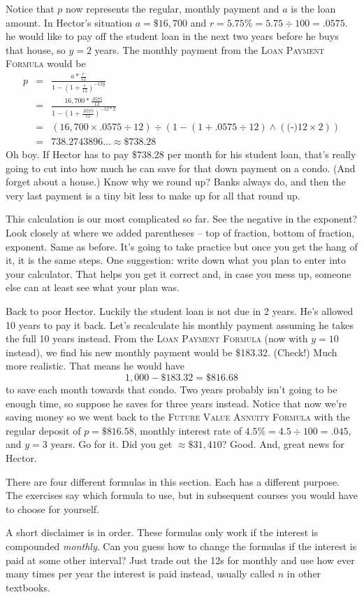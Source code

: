Notice that $p$ now represents the regular, monthly payment and $a$ is the loan amount.
In Hector's situation $a = \$16,700$ and $r=5.75\%=5.75 \div 100=.0575$. he would like to pay off the student loan in the next two years before he buys that house, so $y=2$ years.  The monthly payment from the  \textsc{Loan Payment Formula} would be
\begin{eqnarray*}
p & = &   \frac{a  \ast \frac{r}{12}}{1-\left( 1 + \frac{r}{12}\right) ^{-12y}} \\
& = &    \frac{16,700 \ast \frac{.0575}{12}}{1-\left( 1 + \frac{.0575}{12}\right) ^{-12\ast 2}}\\
& =  & \left(16,700 \times .0575 \div 12 \right) \div \left(1-(1+.0575 \div 12) \wedge (\text{(-)}12 \times 2)\right) \\
& =  & 738.2743896\ldots  \approx \$738.28
\end{eqnarray*}
Oh boy.  If Hector has to pay \$738.28 per month for his student loan, that's really going to cut into how much he can save for that down payment on a condo.  (And forget about a house.) Know why we round up?  Banks always do, and then the very last payment is a tiny bit less to make up for all that round up.

This calculation is our most complicated so far. See the negative in the exponent? Look closely at where we added parentheses -- top of fraction, bottom of fraction, exponent.  Same as before.  It's going to take practice but once you get the hang of it, it is the same steps.  One suggestion: write down what you plan to enter into your calculator.  That helps you get it correct and, in case you mess up, someone else can at least see what your plan was. 

Back to poor Hector. Luckily the student loan is not due in 2 years.  He's allowed 10 years to pay it back.  Let's recalculate his monthly payment assuming he takes the full 10 years instead. From the  \textsc{Loan Payment Formula} (now with $y=10$ instead), we find his new monthly payment would be \$183.32.  (Check!) 
Much more realistic.  That means he would have $$1,000 - \$183.32 = \$816.68$$ to save each month towards that condo.  Two years probably isn't going to be enough time, so suppose he saves for three years instead. Notice that now we're saving money so we went back to the \textsc{Future Value Annuity Formula} with the regular deposit of $p=\$816.58$, monthly interest rate of $4.5\% = 4.5 \div 100 = .045$, and $y=3$ years.  
Go for it.  Did you get $ \approx \$31,410$?  Good.  And, great news for Hector.

There are four different formulas in this section.  Each has a different purpose.  The exercises say which formula to use, but in subsequent courses you would have to choose for yourself.  

A short disclaimer is in order.  These formulas only work if the interest is compounded \emph{monthly}.  Can you guess how to change the formulas if the interest is paid at some other interval?  Just trade out the 12s for monthly and use how ever many times per year the interest is paid instead, usually called $n$ in other textbooks.

